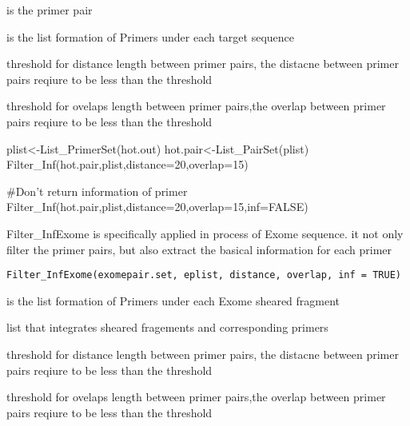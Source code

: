 \documentclass[a4paper]{book}
\begin{document}
%
\begin{Arguments}
\begin{ldescription}
\item[\code{hot.pair}] is the primer pair

\item[\code{plist}] is the list formation of  Primers under each target sequence

\item[\code{distance}] threshold for distance length between primer pairs, the distacne between primer pairs reqiure
to be less than the threshold

\item[\code{overlap}] threshold for ovelaps length between primer pairs,the overlap between primer pairs reqiure
to be less than the threshold
\end{ldescription}
\end{Arguments}
%
\begin{Examples}
\begin{ExampleCode}
plist<-List_PrimerSet(hot.out)
hot.pair<-List_PairSet(plist)
Filter_Inf(hot.pair,plist,distance=20,overlap=15)

#Don't return information of primer
Filter_Inf(hot.pair,plist,distance=20,overlap=15,inf=FALSE)
\end{ExampleCode}
\end{Examples}
%
\begin{Description}\relax
Filter\_InfExome is specifically applied in process of Exome sequence.
it not only filter the primer pairs, but also extract the basical information for each primer
\end{Description}
%
\begin{Usage}
\begin{verbatim}
Filter_InfExome(exomepair.set, eplist, distance, overlap, inf = TRUE)
\end{verbatim}
\end{Usage}
%
\begin{Arguments}
\begin{ldescription}
\item[\code{exomepair.set}] is the list formation of  Primers under each Exome sheared fragment

\item[\code{eplist}] list that integrates sheared fragements and corresponding primers

\item[\code{distance}] threshold for distance length between primer pairs, the distacne between primer pairs reqiure
to be less than the threshold

\item[\code{overlap}] threshold for ovelaps length between primer pairs,the overlap between primer pairs reqiure
to be less than the threshold
\end{ldescription}
\end{Arguments}
\end{document}
